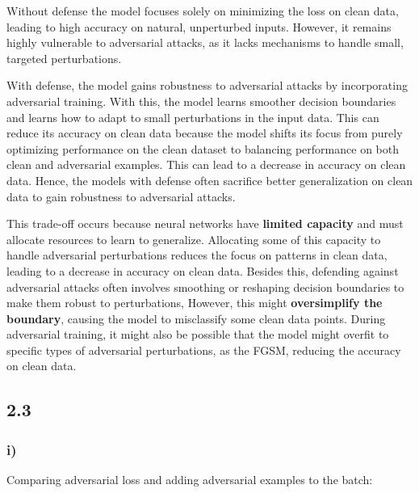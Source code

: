 \documentclass{article}
\begin{document}
Without defense the model focuses solely on minimizing the loss on clean data, leading to high accuracy on natural,
unperturbed inputs. However, it remains highly vulnerable to adversarial attacks, as it lacks mechanisms to handle small,
targeted perturbations. 

With defense, the model gains robustness to adversarial attacks by incorporating adversarial training. With this,
the model learns smoother decision boundaries and learns how to adapt to small perturbations in the input data. This
can reduce its accuracy on clean data because the model shifts its focus from purely optimizing performance on the clean dataset
to balancing performance on both clean and adversarial examples. This can lead to a decrease in accuracy on clean data.
Hence, the models with defense often sacrifice better generalization on clean data to gain robustness to adversarial attacks.

This trade-off occurs because neural networks have \textbf{limited capacity} and must allocate resources to learn to generalize.
Allocating some of this capacity to handle adversarial perturbations reduces the focus on patterns in clean data, leading to
a decrease in accuracy on clean data.
Besides this, defending against adversarial attacks often involves smoothing or reshaping decision boundaries to make them robust
to perturbations, However, this might \textbf{oversimplify the boundary}, causing the model to misclassify some clean data points.
During adversarial training, it might also be possible that the model might overfit to specific types of adversarial perturbations,
as the FGSM, reducing the accuracy on clean data.


\subsection*{2.3}

\subsubsection*{i)}

Comparing adversarial loss and adding adversarial examples to the batch: 
\end{document}
